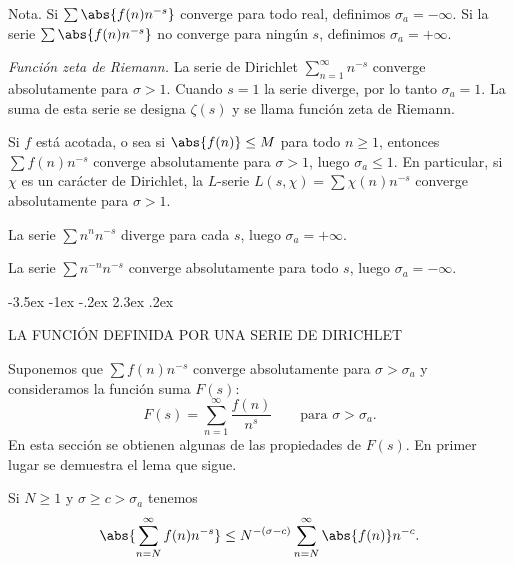 \documentclass[12pt,a4paper]{book}
\makeatletter
\renewcommand\section{\@startsection{section}{1}{\z@}%
  {-3.5ex \@plus -1ex \@minus -.2ex}%
  {2.3ex \@plus .2ex}%
  {\normalfont\Large\bfseries\raggedright}}
\makeatother
\begin{document}
    Nota. Si $\sum\abs{f(n)n^{-s}}$ converge para todo real, definimos $\sigma_{a}=-\infty$. Si
    la serie $\sum\abs{f(n)n^{-s}}$ no converge para ningún $s$, definimos $\sigma_{a}=+\infty$.

    \begin{ejemplo}
        \textit{Función zeta de Riemann.} La serie de Dirichlet $\sum_{n=1}^{\infty}n^{-s}$
        converge absolutamente para $\sigma>1$. Cuando $s=1$ la serie diverge, por lo tanto
        $\sigma_{a}=1$. La suma de esta serie se designa $\zeta(s)$ y se llama función zeta de
        Riemann.
    \end{ejemplo}

    \begin{ejemplo}
        Si $f$ está acotada, o sea si $\abs{f(n)}\leq M$ para todo $n\geq1$, entonces
        $\sum f(n)n^{-s}$ converge absolutamente para $\sigma>1$, luego $\sigma_{a}\leq1$. En
        particular, si $\chi$ es un carácter de Dirichlet, la $L$-serie
        $L(s,\chi)=\sum\chi(n)n^{-s}$ converge absolutamente para $\sigma>1$.
    \end{ejemplo}

    \begin{ejemplo}
        La serie $\sum n^{n}n^{-s}$ diverge para cada $s$, luego $\sigma_{a}=+\infty$.
    \end{ejemplo}

    \begin{ejemplo}
        La serie $\sum n^{-n}n^{-s}$ converge absolutamente para todo $s$, luego
        $\sigma_{a}=-\infty$.
    \end{ejemplo}

    \section{LA FUNCIÓN DEFINIDA POR UNA SERIE DE DIRICHLET}

    Suponemos que $\sum f(n)n^{-s}$ converge absolutamente para $\sigma>\sigma_{a}$ y
    consideramos la función suma $F(s)$:
    \begin{equation}\label{eq:11-4}
        F(s)=\sum_{n=1}^{\infty}\frac{f(n)}{n^{s}}\qquad\text{para }\sigma>\sigma_{a}.
    \end{equation}
    En esta sección se obtienen algunas de las propiedades de $F(s)$. En primer lugar se
    demuestra el lema que sigue.

    \begin{lema}\label{lem:11-1}
        Si $N\geq1$ y $\sigma\geq c>\sigma_{a}$ tenemos
        \begin{equation*}
            \abs{\sum_{n=N}^{\infty}f(n)n^{-s}}\leq N^{-(\sigma-c)}\sum_{n=N}^{\infty}\abs{f(n)}n^{-c}.
        \end{equation*}
    \end{lema}
\end{document}
